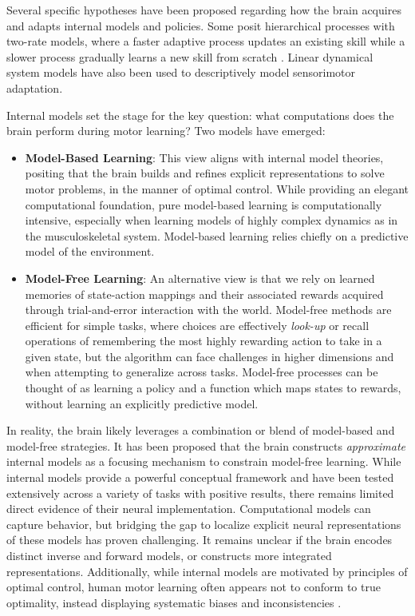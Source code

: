 \documentclass[../main.tex]{subfiles}
\begin{document}
Several specific hypotheses have been proposed regarding how the brain acquires and adapts internal models and policies. Some posit hierarchical processes with two-rate models, where a faster adaptive process updates an existing skill while a slower process gradually learns a new skill from scratch \cite{smithInteractingAdaptiveProcesses2006}. Linear dynamical system models have also been used to descriptively model sensorimotor adaptation\cite{chengModelingSensorimotorLearning}.

Internal models set the stage for the key question: what computations does the brain perform during motor learning? Two models have emerged:
%
\begin{itemize}
  \item \textbf{Model-Based Learning}: This view aligns with internal model theories, positing that the brain builds and refines explicit representations to solve motor problems, in the manner of optimal control. While providing an elegant computational foundation, pure model-based learning is computationally intensive, especially when learning models of highly complex dynamics as in the musculoskeletal system. Model-based learning relies chiefly on a predictive model of the environment.
  \item \textbf{Model-Free Learning}: An alternative view is that we rely on learned memories of state-action mappings and their associated rewards acquired through trial-and-error interaction with the world. Model-free methods are efficient for simple tasks, where choices are effectively \textit{look-up} or recall operations of remembering the most highly rewarding action to take in a given state, but the algorithm can face challenges in higher dimensions and when attempting to generalize across tasks. Model-free processes can be thought of as learning a policy and a function which maps states to rewards, without learning an explicitly predictive model.
\end{itemize}
%
In reality, the brain likely leverages a combination or blend of model-based and model-free strategies. It has been proposed that the brain constructs \emph{approximate} internal models as a focusing mechanism to constrain model-free learning\cite{dawModelBasedInfluencesHumans2011}. While internal models provide a powerful conceptual framework and have been tested extensively across a variety of tasks with positive results, there remains limited direct evidence of their neural implementation. Computational models can capture behavior, but bridging the gap to localize explicit neural representations of these models has proven challenging. It remains unclear if the brain encodes distinct inverse and forward models, or constructs more integrated representations. Additionally, while internal models are motivated by principles of optimal control, human motor learning often appears not to conform to true optimality, instead displaying systematic biases and inconsistencies \cite{loebHierarchicalFoundationModels1999,loebHardLessonsMotor1987}.
\end{document}
